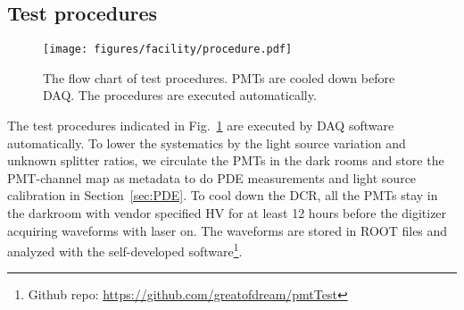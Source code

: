 \subsection{Test procedures}
\begin{figure}
    \centering
    \texttt{[image: figures/facility/procedure.pdf]}
    \caption{The flow chart of test procedures. PMTs are cooled down before DAQ. The procedures are executed automatically.}
    \label{fig:testingprocedure}
\end{figure}

The test procedures indicated in Fig.~\ref{fig:testingprocedure} are executed by DAQ software automatically. To lower the systematics by the light source variation and unknown splitter ratios, we circulate the PMTs in the dark rooms and store the PMT-channel map as metadata to do PDE measurements and light source calibration in Section~\ref{sec:PDE}. To cool down the DCR, all the PMTs stay in the darkroom with vendor specified HV for at least 12 hours before the digitizer acquiring waveforms with laser on. The waveforms are stored in ROOT files and analyzed with the self-developed software\footnote{Github repo: \url{https://github.com/greatofdream/pmtTest}}.
